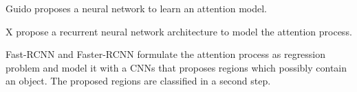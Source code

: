 	Guido proposes a neural network to learn an attention model.
	
	X propose a recurrent neural network architecture to model the attention process.
	
	Fast-RCNN \cite{Ren} and Faster-RCNN \cite{Ren2015} formulate the attention process as regression problem and model it with a \acp{CNN} that proposes regions which possibly contain an object. The proposed regions are classified in a second step. 
	

	
